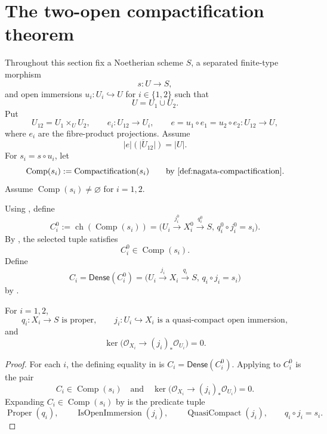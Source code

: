 \section{The two-open compactification theorem}

Throughout this section fix a Noetherian scheme $S$, a separated finite-type
morphism
\[
  s\colon U\longrightarrow S,
\]
and open immersions $u_i\colon U_i\hookrightarrow U$ for $i\in\{1,2\}$ such
that
\[
  U=U_1\cup U_2.
\]
Put
\[
  U_{12}=U_1\times_UU_2,\qquad
  e_i\colon U_{12}\to U_i,\qquad
  e=u_1\circ e_1=u_2\circ e_2\colon U_{12}\to U,
\]
where $e_i$ are the fibre-product projections.  Assume
\[
  \overline{|e|(|U_{12}|)}=|U|.
\]
For $s_i=s\circ u_i$, let
\[
  \operatorname{Comp}(s_i)
    :=\operatorname{Compactification}(s_i)
    \qquad\text{by \Cref{def:nagata-compactification}}.
\]
Assume $\operatorname{Comp}(s_i)\neq\varnothing$ for $i=1,2$.

\begin{definition}
  \label{def:nagata-two-open-dense-compactifications}
  \lean{}

  Using , define
  \[
    C_i^0
      :=\operatorname{ch}(\operatorname{Comp}(s_i))
      =\bigl(
          U_i\xrightarrow{j_i^0}X_i^0\xrightarrow{q_i^0}S,\,
          q_i^0\circ j_i^0=s_i
        \bigr).
  \]
  By , the selected tuple satisfies
  \[
    C_i^0\in\operatorname{Comp}(s_i).                            \tag{TODC0}
  \]
  Define
  \[
    C_i=\mathsf{Dense}(C_i^0)
      =\bigl(
          U_i\xrightarrow{j_i}X_i\xrightarrow{q_i}S,\,
          q_i\circ j_i=s_i
        \bigr)
  \]
  by .
\end{definition}

\begin{lemma}
  \label{lemma:nagata-two-open-dense-compactifications}
  \lean{}

  For $i=1,2$,
  \[
    q_i\colon X_i\to S\text{ is proper},\qquad
    j_i\colon U_i\hookrightarrow X_i\text{ is a quasi-compact open immersion},
  \]
  and
  \[
    \ker\bigl(\mathcal O_{X_i}\to(j_i)_*\mathcal O_{U_i}\bigr)=0.
  \]
\end{lemma}

\begin{proof}
  For each $i$, the defining equality in
   is
  $C_i=\mathsf{Dense}(C_i^0)$.  Applying
   to $C_i^0$ is the pair
  \[
    C_i\in\operatorname{Comp}(s_i)
    \quad\text{and}\quad
    \ker\bigl(\mathcal O_{X_i}\to(j_i)_*\mathcal O_{U_i}\bigr)=0.
  \]
  Expanding $C_i\in\operatorname{Comp}(s_i)$ by
   is the predicate tuple
  \[
    \operatorname{Proper}(q_i),\qquad
    \operatorname{IsOpenImmersion}(j_i),\qquad
    \operatorname{QuasiCompact}(j_i),\qquad
    q_i\circ j_i=s_i.
  \]
\end{proof}

